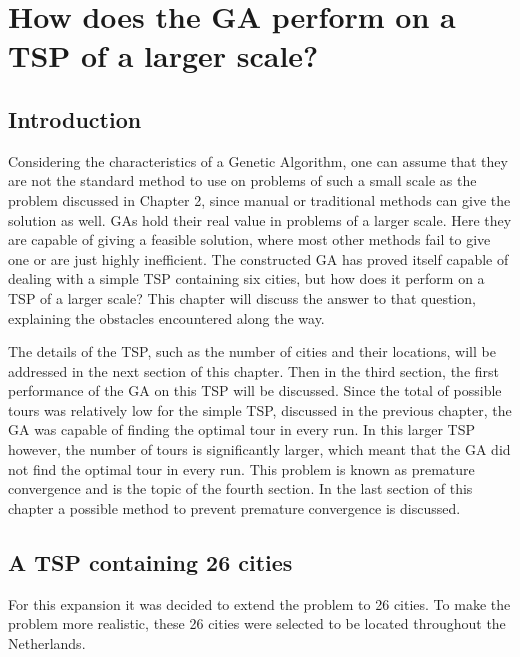 \chapter{How does the GA perform on a TSP of a larger scale?}
\section{Introduction}

\par
Considering the characteristics of a Genetic Algorithm, one can assume that they are not the standard method to use on problems of such a small scale as the problem discussed in Chapter 2, since manual or traditional methods can give the solution as well. GAs hold their real value in problems of a larger scale. Here they are capable of giving a feasible solution, where most other methods fail to give one or are just highly inefficient. The constructed GA has proved itself capable of dealing with a simple TSP containing six cities, but how does it perform on a TSP of a larger scale? This chapter will discuss the answer to that question, explaining the obstacles encountered along the way.

\par
The details of the TSP, such as the number of cities and their locations, will be addressed in the next section of this chapter. Then in the third section, the first performance of the GA on this TSP will be discussed. Since the total of possible tours was relatively low for the simple TSP, discussed in the previous chapter, the GA was capable of finding the optimal tour in every run. In this larger TSP however, the number of tours is significantly larger, which meant that the GA did not find the optimal tour in every run. This problem is known as premature convergence and is the topic of the fourth section. In the last section of this chapter a possible method to prevent premature convergence is discussed.

\section{A TSP containing 26 cities}
For this expansion it was decided to extend the problem to 26 cities. To make the problem more realistic, these 26 cities were selected to be located throughout the Netherlands. 

